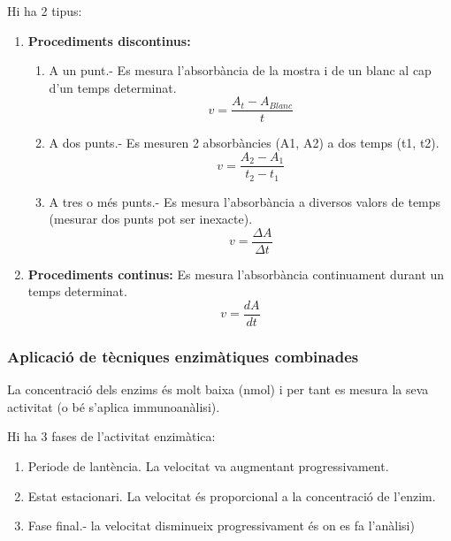 Hi ha 2 tipus:
\begin{enumerate}
\item \textbf{Procediments discontinus:}
  \begin{enumerate}
  \item A un punt.- Es mesura l’absorbància de la mostra i de un blanc
    al cap d’un temps determinat.
    \begin{equation}
      \label{eq:1}
      v = \frac{A_t-A_{Blanc}}{t}
    \end{equation}
  \item A dos punts.- Es mesuren 2 absorbàncies (A1, A2) a dos temps
    (t1, t2).
    \begin{equation}
      \label{eq:2}
      v = \frac{A_2-A_1}{t_2-t_1}
    \end{equation}
  \item A tres o més punts.- Es mesura l’absorbància a diversos valors
    de temps (mesurar dos punts pot ser inexacte).
    \begin{equation}
      \label{eq:3}
      v = \frac{\Delta A}{\Delta t}
    \end{equation}
  \end{enumerate}

\item \textbf{Procediments continus:} Es mesura l’absorbància
  continuament durant un temps determinat.
  \begin{equation}
    \label{eq:4}
    v = \frac{d A}{d t} 
  \end{equation}
\end{enumerate}

\subsubsection{Aplicació de tècniques enzimàtiques combinades}
La concentració dels enzims és molt baixa (nmol) i per tant es mesura
la seva activitat (o bé s'aplica immunoanàlisi).

Hi ha 3 fases de l'activitat enzimàtica:
\begin{enumerate}
\item Periode de lantència. La velocitat va augmentant progressivament.
\item Estat estacionari. La velocitat és proporcional a la
  concentració de l’enzim. 
\item Fase final.- la velocitat disminueix progressivament és on es fa
  l'anàlisi)
\end{enumerate}

